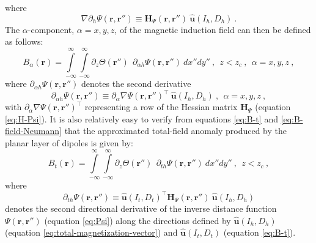 where
\begin{equation}
\nabla \partial_{h} \Psi(\mathbf{r}, \mathbf{r}'') \equiv
\mathbf{H}_{\Psi}(\mathbf{r}, \mathbf{r}'') \: 
\hat{\mathbf{u}}(I_{h}, D_{h}) \: .
\label{eq:nabla-Dh-Psi}
\end{equation}
The $\alpha$-component, $\alpha = x, y, z$, of the magnetic induction field
can then be defined as follows:
\begin{equation}
B_{\alpha}(\mathbf{r}) = 
\int\limits_{-\infty}^{\infty} \int\limits_{-\infty}^{\infty}
\partial_{z} \Theta(\mathbf{r}'') \:\: 
\partial_{\alpha h} \Psi(\mathbf{r}, \mathbf{r}'') \: 
dx''dy'' \: , \:\: z < z_{c} \: , \:\: \alpha = x, y, z \: ,
\label{eq:B-alpha-Neumann}
\end{equation}
where $\partial_{\alpha h} \Psi(\mathbf{r}, \mathbf{r}'')$ denotes the second
derivative
\begin{equation}
\partial_{\alpha h} \Psi(\mathbf{r}, \mathbf{r}'') \equiv
\partial_{\alpha} \nabla \Psi (\mathbf{r}, \mathbf{r}'')^{\top} \:
\hat{\mathbf{u}}(I_{h}, D_{h}) \: , \:\: \alpha = x, y, z \: ,
\label{eq:Dalphah-Psi}
\end{equation}
with $\partial_{\alpha} \nabla \Psi (\mathbf{r}, \mathbf{r}'')^{\top}$ representing
a row of the Hessian matrix $\mathbf{H}_{\Psi}$ (equation \ref{eq:H-Psi}).
It is also relatively easy to verify from equations 
\ref{eq:B-t} and \ref{eq:B-field-Neumann} that the approximated total-field 
anomaly produced by the planar layer of dipoles is given by:
\begin{equation}
B_{t}(\mathbf{r}) = 
\int\limits_{-\infty}^{\infty} \int\limits_{-\infty}^{\infty}
\partial_{z} \Theta(\mathbf{r}'') \:\: 
\partial_{th} \Psi(\mathbf{r}, \mathbf{r}'') \: 
dx''dy'' \: , \:\: z < z_{c} \: ,
\label{eq:B-t-Neumann}
\end{equation}
where
\begin{equation}
\partial_{th} \Psi(\mathbf{r}, \mathbf{r}'') \equiv
\hat{\mathbf{u}}(I_{t}, D_{t})^{\top} 
\mathbf{H}_{\Psi}(\mathbf{r}, \mathbf{r}'') \: 
\hat{\mathbf{u}}(I_{h}, D_{h}) 
\label{eq:Dth-Psi}
\end{equation}
denotes the second directional derivative of the inverse distance function
$\Psi(\mathbf{r}, \mathbf{r}'')$ (equation \ref{eq:Psi}) 
along the directions defined by $\hat{\mathbf{u}}(I_{h}, D_{h})$ 
(equation \ref{eq:total-magnetization-vector}) and 
$\hat{\mathbf{u}}(I_{t}, D_{t})$ (equation \ref{eq:B-t}).

